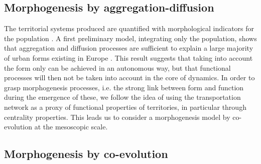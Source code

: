 \documentclass[11pt]{article}
\begin{document}
\subsection{Morphogenesis by aggregation-diffusion}

The territorial systems produced are quantified with morphological indicators for the population \citep{le2015forme}. A first preliminary model, integrating only the population, shows that aggregation and diffusion processes are sufficient to explain a large majority of urban forms existing in Europe \citep{raimbault2018calibration}. This result suggests that taking into account the form only can be achieved in an autonomous way, but that functional processes will then not be taken into account in the core of dynamics. In order to grasp morphogenesis processes, i.e. the strong link between form and function during the emergence of these, we follow the idea of using the transportation network as a proxy of functional properties of territories, in particular through centrality properties. This leads us to consider a morphogenesis model by co-evolution at the mesoscopic scale.


\subsection{Morphogenesis by co-evolution}
\end{document}

